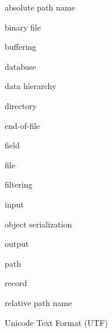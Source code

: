 \begin{KT}
absolute path name

binary file


buffering


database

data hierarchy

directory

end-of-file 

field

file

filtering


input  %

object serialization

output %


path


record

relative path name



Unicode Text Format (UTF)

\end{KT}


